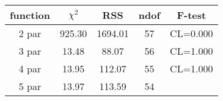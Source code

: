 \begin{tabular}{c|c|c|c|c}
function & $\chi^2$ & RSS & ndof & F-test \\
\hline
2 par & 925.30 & 1694.01 & 57 & CL=0.000 \\
3 par & 13.48 & 88.07 & 56 & CL=1.000 \\
4 par & 13.95 & 112.07 & 55 & CL=1.000 \\
5 par & 13.97 & 113.59 & 54 & \\
\hline
\end{tabular}
